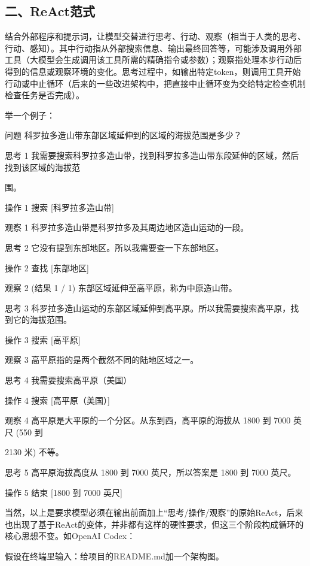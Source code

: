 \hypertarget{ux4e8creactux8303ux5f0f}{%
\subsection{二、ReAct范式}\label{ux4e8creactux8303ux5f0f}}

结合外部程序和提示词，让模型交替进行思考、行动、观察（相当于人类的思考、行动、感知）。其中行动指从外部搜索信息、输出最终回答等，可能涉及调用外部工具（大模型会生成调用该工具所需的精确指令或参数）；观察指处理本步行动后得到的信息或观察环境的变化。思考过程中，如输出特定token，则调用工具开始行动或中止循环（后来的一些改进架构中，把直接中止循环变为交给特定检查机制检查任务是否完成）。

举一个例子：

问题 科罗拉多造山带东部区域延伸到的区域的海拔范围是多少？

思考 1 我需要搜索科罗拉多造山带，找到科罗拉多造山带东段延伸的区域，然后找到该区域的海拔范

围。

操作 1 搜索 {[}科罗拉多造山带{]}

观察 1 科罗拉多造山带是科罗拉多及其周边地区造山运动的一段。

思考 2 它没有提到东部地区。所以我需要查一下东部地区。

操作 2 查找 {[}东部地区{]}

观察 2 (结果 1 / 1) 东部区域延伸至高平原，称为中原造山带。

思考 3 科罗拉多造山运动的东部区域延伸到高平原。所以我需要搜索高平原，找到它的海拔范围。

操作 3 搜索 {[}高平原{]}

观察 3 高平原指的是两个截然不同的陆地区域之一。

思考 4 我需要搜索高平原（美国）

操作 4 搜索 {[}高平原（美国）{]}

观察 4 高平原是大平原的一个分区。从东到西，高平原的海拔从 1800 到 7000 英尺 (550 到

2130 米) 不等。

思考 5 高平原海拔高度从 1800 到 7000 英尺，所以答案是 1800 到 7000 英尺。

操作 5 结束 {[}1800 到 7000 英尺{]}

当然，以上是要求模型必须在输出前面加上``思考/操作/观察''的原始ReAct，后来也出现了基于ReAct的变体，并非都有这样的硬性要求，但这三个阶段构成循环的核心思想不变。如OpenAI Codex：

假设在终端里输入：给项目的README.md加一个架构图。

